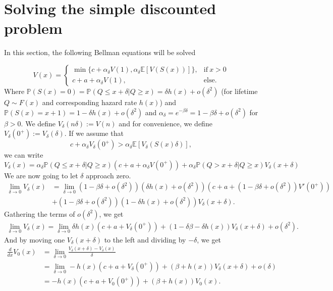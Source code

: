 \section{Solving the simple discounted problem}
In this section, the following Bellman equations will be solved

\begin{equation}
V(x)=\begin{cases}
\min\{c+\alpha_\delta V(1),\alpha_\delta \mathbb{E}[V(S(x))]\},&\text{if}\ x>0 \\
c+a+\alpha_\delta V(1),&\text{else.}
\end{cases}
\end{equation}
Where $\mathbb{P}(S(x)=0)=\mathbb{P}(Q\leq x+\delta|Q\geq x)=\delta h(x)+o(\delta^2)$ (for lifetime $Q\sim F(x)$ and corresponding hazard rate $h(x)$) and $\mathbb{P}(S(x)=x+1)=1-\delta h(x)+o(\delta^2)$ and $\alpha_\delta=e^{-\beta \delta}=1-\beta \delta + o(\delta^2)$ for $\beta>0$.
We define $V_\delta(n\delta):=V(n)$ and for convenience, we define $V_\delta(0^+):=V_\delta(\delta)$.
If we assume that 
$$
c+\alpha_\delta V_\delta(0^+)>\alpha_\delta \mathbb{E}[V_\delta(S(x)\delta)],
$$
we can write
\begin{equation}
V_\delta(x)=\alpha_\delta \mathbb{P}(Q\leq x+\delta|Q\geq x) (c+a+\alpha_\delta V(0^+))+\alpha_\delta \mathbb{P}(Q>x+\delta|Q\geq x)V_\delta(x+\delta)
\end{equation}
We are now going to let $\delta$ approach zero.
\begin{equation}
\begin{split}
\lim\limits_{\delta\rightarrow 0} V_\delta(x) &=
\lim\limits_{\delta\rightarrow 0}(1-\beta\delta+o(\delta^2)) (\delta h(x)+o(\delta^2))(c+a+(1-\beta\delta+o(\delta^2)) V'(0^+))\\
&+(1-\beta\delta+o(\delta^2)) (1-\delta h(x)+o(\delta^2))V_\delta(x+\delta).
\end{split}
\end{equation}
Gathering the terms of $o(\delta^2)$, we get
\begin{equation}\label{eq:gatheredDelta}
\begin{split}
\lim\limits_{\delta\rightarrow 0} V_\delta(x) =
\lim\limits_{\delta\rightarrow 0}\delta h(x)(c+a+ V_\delta(0^+))+(1-\delta\beta-\delta h(x)) V_\delta(x+\delta)+o(\delta^2).
\end{split}
\end{equation}
And by moving one $V_\delta(x+\delta)$ to the left and dividing by $-\delta$, we get
\begin{equation}\label{eq:bellmannDifferential}
\begin{split}
\frac{d}{dx}V_0(x)&=\lim\limits_{\delta\rightarrow 0} \frac{V_\delta(x+\delta)-V_\delta(x)}{\delta} \\
&=\lim\limits_{\delta\rightarrow 0} -h(x)(c+a+ V_\delta(0^+))+(\beta+ h(x)) V_\delta(x+\delta)+o(\delta)\\
&=-h(x)(c+a+ V_0(0^+))+(\beta+ h(x)) V_0(x).
\end{split}
\end{equation}
